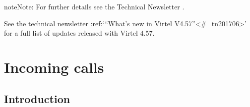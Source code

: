 \documentclass[letterpaper,10pt,english]{sphinxmanual}
\begin{document}
\begin{sphinxadmonition}{note}{Note:}
For further details see the Technical Newsletter .
\end{sphinxadmonition}

See the technical newsletter :ref:‘“What’s new in Virtel V4.57”\textless{}\#\_tn201706\textgreater{}’ for a full list of updates released with Virtel 4.57.


\chapter{Incoming calls}
\label{\detokenize{User_Guide:virtel457ug}}\label{\detokenize{User_Guide:index-0}}\label{\detokenize{User_Guide:incoming-calls}}\label{\detokenize{User_Guide:user-guide-v4-57}}

\section{Introduction}
\label{\detokenize{User_Guide:introduction}}
\end{document}
